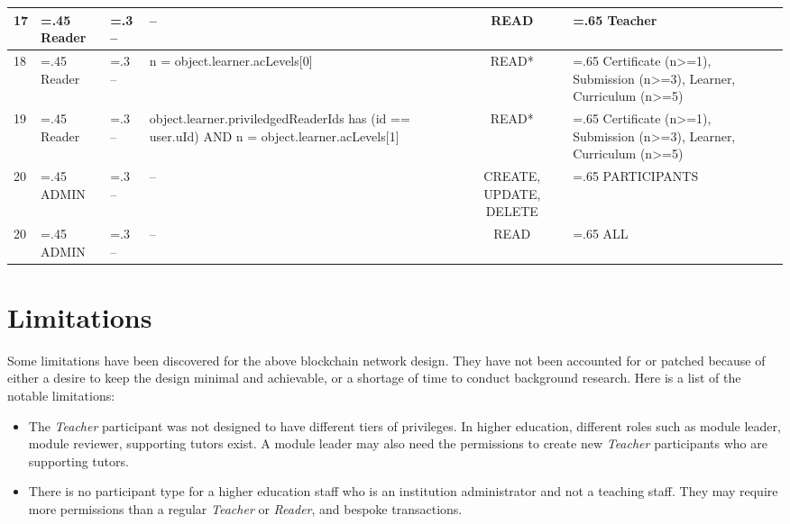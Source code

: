 \begin{landscape}
\begin{table}
\begin{tabularx}{24cm}{l>{\hsize=.45\hsize}X>{\hsize=.3\hsize}X>{\hsize=0.9\hsize}Xc>{\hsize=.65\hsize}X}
			\midrule
			17 & Reader & --          & --                                                                                          & READ                   & Teacher                                                                             \\
			\midrule
			18 & Reader & --          & n = object.learner.acLevels[0]                                                              & READ*                  & Certificate (n>=1), \newline Submission (n>=3), \newline Learner, Curriculum (n>=5) \\
			\midrule
			19 & Reader & --          & object.learner.priviledgedReaderIds has (id == user.uId) AND n = object.learner.acLevels[1] & READ*                  & Certificate (n>=1), \newline Submission (n>=3), \newline Learner, Curriculum (n>=5) \\
			\midrule
			20 & ADMIN  & --          & --                                                                                          & CREATE, UPDATE, DELETE & PARTICIPANTS                                                                        \\
			\midrule
			20 & ADMIN  & --          & --                                                                                          & READ                   & ALL                                                                                 \\
			\bottomrule
		\end{tabularx}
	\end{table}

\end{landscape}

\section{Limitations}

Some limitations have been discovered for the above blockchain network design. They have not been accounted for or patched
because of either a desire to keep the design minimal and achievable, or a shortage of time to conduct background research.
Here is a list of the notable limitations:

\begin{itemize}
	\item The \textit{Teacher} participant was not designed to have different tiers of privileges. In higher education,
	      different roles such as module leader, module reviewer, supporting tutors exist. A module leader may also need the
	      permissions to create new \textit{Teacher} participants who are supporting tutors.
	\item There is no participant type for a higher education staff who is an institution administrator and not a teaching staff.
	      They may require more permissions than a regular \textit{Teacher} or \textit{Reader}, and bespoke transactions.
\end{itemize}

